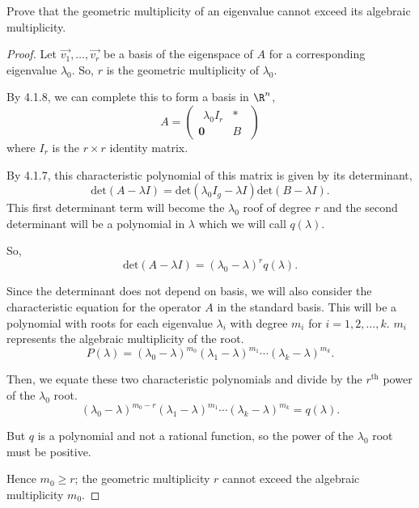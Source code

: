 \documentclass{article}
\begin{document}
  Prove that the geometric multiplicity of an eigenvalue cannot exceed its algebraic multiplicity.
\begin{proof}
  Let $\vec{v_1},\ldots,\vec{v_r}$ be a basis of the eigenspace of $A$ for a corresponding eigenvalue $\lambda_0$. So, $r$ is the geometric multiplicity of $\lambda_0$. 

  By 4.1.8, we can complete this to form a basis in $\R^{n}$,
  \[
    A=
    \begin{pmatrix} \hspace{5pt}
      \lambda_0 I_r & * \\ \mathbf{0} & B
  \hspace{5pt} \end{pmatrix} 
  \] 
  where $I_r$ is the $r\times r$ identity matrix.

  By 4.1.7, this characteristic polynomial of this matrix is given by its determinant,
  \[
  \text{det}(A-\lambda I)=\text{det}(\lambda_0 I_g - \lambda I)\text{det}(B-\lambda I)
  .\] 
  This first determinant term will become the $\lambda_0$ roof of degree $r$ and the second determinant will be a polynomial in $\lambda$ which we will call $q(\lambda)$.

  So, \[
    \text{det}(A-\lambda I)={(\lambda_0 - \lambda)}^r q(\lambda)
  .\] 

  Since the determinant does not depend on basis, we will also consider the characteristic equation for the operator $A$ in the standard basis. This will be a polynomial with roots for each eigenvalue  $\lambda_i$ with degree $m_i$ for $i=1,2,\ldots,k$. $m_i$ represents the algebraic multiplicity of the root.
  \[
    P(\lambda)={(\lambda_0-\lambda)}^{m_0}{(\lambda_1-\lambda)}^{m_1}\cdots{(\lambda_k-\lambda)}^{m_k}
  .\] 

  Then, we equate these two characteristic polynomials and divide by the $r^{\text{th}}$ power of the $\lambda_0$ root.
  \[
    {(\lambda_0 - \lambda)}^{m_0-r}{(\lambda_1 - \lambda)}^{m_1}\cdots{(\lambda_k-\lambda)}^{m_k}=q(\lambda)
  .\] 

  But $q$ is a polynomial and not a rational function, so the power of the $\lambda_0$ root must be positive. 

  Hence $m_0 \ge r$; the geometric multiplicity $r$ cannot exceed the algebraic multiplicity $m_0$. 
\end{proof}
\end{document}
